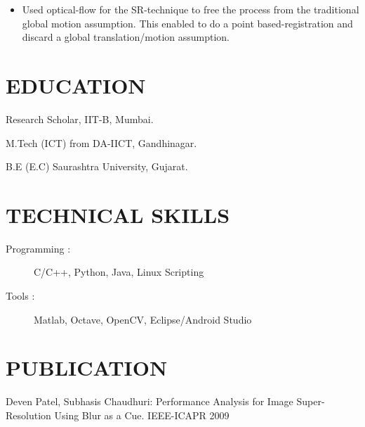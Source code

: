 \documentclass{res}
\begin{document}
\begin{resume}
\begin{itemize}
\item  Used optical-flow for  the SR-technique to  free the process  from the traditional global motion assumption. This enabled to do a point based-registration  and discard a global translation/motion assumption.
\end{itemize}

\section{EDUCATION}          
\begin{description}
 \item    Research Scholar, IIT-B, Mumbai. 
  \item  M.Tech (ICT) from DA-IICT, Gandhinagar.  
   \item     B.E (E.C) Saurashtra University, Gujarat.   
\end{description}    

\section{TECHNICAL SKILLS}          
\begin{description}
\item [Programming      :]  C/C++, Python, Java, Linux Scripting 
\item [Tools            :] Matlab, Octave, OpenCV, Eclipse/Android Studio
\end{description}


\section{PUBLICATION}
\begin{description}
\item   Deven Patel, Subhasis Chaudhuri: Performance Analysis for Image Super-Resolution Using Blur as a Cue. IEEE-ICAPR 2009
\end{description}



 
\end{resume}
\end{document}
